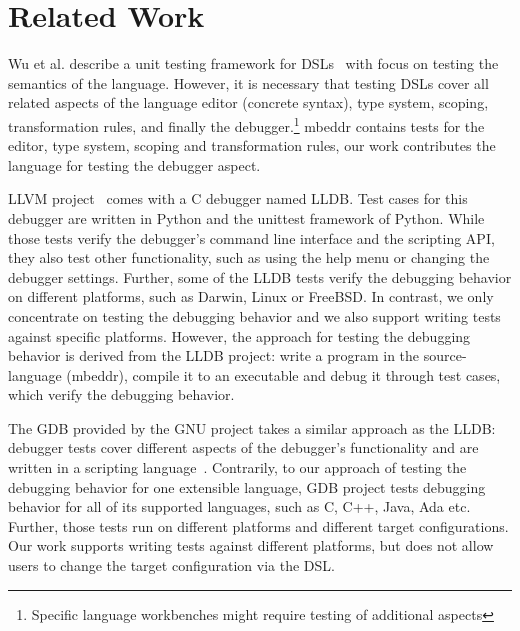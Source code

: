 \section{Related Work}

Wu et al. describe a unit testing framework for 
\acp{DSL}~\cite{DBLP:conf/dsl/WuGM09} with focus on
testing the semantics of the language.  However, it is necessary that testing
\acp{DSL} cover all related aspects of the language \eg editor
(concrete syntax), type system, scoping, transformation rules, and finally the
debugger.\footnote{Specific language workbenches might require
testing of additional aspects}
mbeddr contains tests for the editor, type system, scoping and transformation
rules, our work contributes the language for testing the debugger aspect.

\ac{LLVM} project~\cite{LLDB} comes with a C debugger named \ac{LLDB}.
Test cases for this debugger are written in Python
and the unittest framework of Python. While those tests verify the debugger’s
command line interface and the scripting API, they also test other
functionality, such as using the help menu or changing the debugger settings.
Further, some of the \ac{LLDB} tests verify the debugging behavior on different
platforms, such as Darwin, Linux or FreeBSD. In contrast, we only concentrate on
testing the debugging behavior and we also support writing tests against
specific platforms. However, the approach for testing the debugging behavior is
derived from the \ac{LLDB} project: write a program in the source-language (mbeddr),
compile it to an executable and debug it through test cases, which verify the
debugging behavior.

The \ac{GDB} provided by the GNU project takes a similar approach as
the \ac{LLDB}: debugger tests cover different aspects of the debugger’s
functionality and are written in a scripting language~\cite{gdb}.
Contrarily, to our approach of testing the debugging behavior 
for one extensible language, \ac{GDB} project tests
debugging behavior for all of its supported languages, such as C, C++, Java, Ada
etc. Further, those tests run on different platforms and different target
configurations. Our work supports writing tests against different platforms, but
does not allow users to change the target configuration via the \ac{DSL}.
